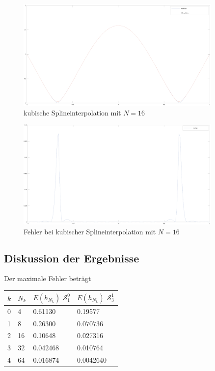 \documentclass[ngerman,a4paper]{texmf/tex/latex/mathscript/mathscript}
\begin{document}
	\begin{figure}[h]
		\centering
		\includegraphics[width=0.9\textwidth]{images/f_kubische_Interpolation.png}
		\caption{kubische Splineinterpolation mit $N=16$}
	\end{figure}
	\pagebreak
	
	\begin{figure}[h]
		\centering
		\includegraphics[width=0.9\textwidth]{images/f_kubische_Interpolation_Fehler.png}
		\caption{Fehler bei kubischer Splineinterpolation mit $N=16$}
	\end{figure}
	
	\subsection{Diskussion der Ergebnisse}
	
	Der maximale Fehler beträgt
	\begin{center}
		\begin{tabular}{ll|l|l}
			$k$ & $N_k$ & $E(h_{N_k})$ $\mathcal{S}_1^0$ & $E(h_{N_k})$ $\mathcal{S}_3^1$ \\
			\hline
			0 & 4 & 0.61130 & 0.19577 \\
			\hline
			1 & 8 & 0.26300 & 0.070736 \\
			\hline 
			2 & 16 & 0.10648 & 0.027316 \\
			\hline 
			3 & 32 & 0.042468 & 0.010764 \\
			\hline 
			4 & 64 & 0.016874 & 0.0042640 \\
		\end{tabular}
	\end{center} 
\end{document}
